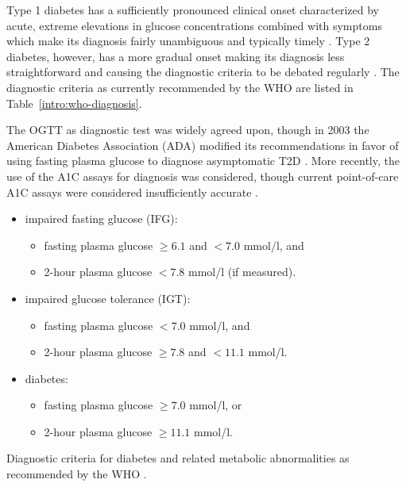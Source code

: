 Type 1 diabetes has a sufficiently pronounced clinical onset characterized by acute, extreme elevations in glucose concentrations combined with symptoms which make its diagnosis fairly unambiguous and typically timely \citep{international2009international}. Type 2 diabetes, however, has a more gradual onset making its diagnosis less straightforward and causing the diagnostic criteria to be debated regularly \citep{world2006definition, international2009international}.  The diagnostic criteria as currently recommended by the WHO are listed in Table~\ref{intro:who-diagnosis}.

The OGTT as diagnostic test was widely agreed upon, though in 2003 the American Diabetes Association (ADA) modified its recommendations in favor of using fasting plasma glucose to diagnose asymptomatic T2D \citep{world2006definition}. More recently, the use of the A1C assays for diagnosis was considered, though current point-of-care A1C assays were considered insufficiently accurate \citep{international2009international}.

\begin{table}[!h]
\colorbox{gray!20!white}{\parbox{\textwidth}{
\begin{itemize}
\item impaired fasting glucose (IFG):
\begin{itemize}
\item fasting plasma glucose $\geq 6.1$ and $< 7.0$ mmol/l, and
\item 2-hour plasma glucose $< 7.8$ mmol/l (if measured).
\end{itemize}
\item impaired glucose tolerance (IGT):
\begin{itemize}
\item fasting plasma glucose $< 7.0$ mmol/l, and
\item 2-hour plasma glucose $\geq 7.8$ and $< 11.1$ mmol/l.
\end{itemize}
\item diabetes:
\begin{itemize}
\item fasting plasma glucose $\geq 7.0$ mmol/l, or
\item 2-hour plasma glucose $\geq 11.1$ mmol/l.
\end{itemize}
\end{itemize}
}}
\caption{Diagnostic criteria for diabetes and related metabolic abnormalities as recommended by the WHO \citep{world2006definition}.} \label{intro:who-diagnosis}
\end{table}

